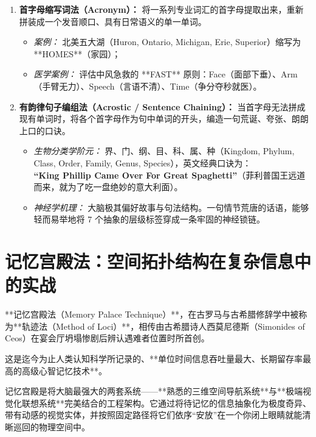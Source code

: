 \documentclass[12pt,a4paper,openany]{ctexbook}
\begin{document}
\begin{enumerate}
    \item \textbf{首字母缩写词法（Acronym）：}
    将一系列专业词汇的首字母提取出来，重新拼装成一个发音顺口、具有日常语义的单一单词。
    \begin{itemize}
        \item \emph{案例：} 北美五大湖（Huron, Ontario, Michigan, Erie, Superior）缩写为 **HOMES**（家园）；
        \item \emph{医学案例：} 评估中风急救的 **FAST** 原则：Face（面部下垂）、Arm（手臂无力）、Speech（言语不清）、Time（争分夺秒就医）。
    \end{itemize}

    \item \textbf{有韵律句子编组法（Acrostic / Sentence Chaining）：}
    当首字母无法拼成现有单词时，将各个首字母作为句中单词的开头，编造一句荒诞、夸张、朗朗上口的口诀。
    \begin{itemize}
        \item \emph{生物分类学阶元：} 界、门、纲、目、科、属、种（Kingdom, Phylum, Class, Order, Family, Genus, Species），英文经典口诀为：\\
        \textbf{“King Phillip Came Over For Great Spaghetti”}（菲利普国王远道而来，就为了吃一盘绝妙的意大利面）。
        \item \emph{神经学机理：} 大脑极其偏好故事与句法结构。一句情节荒唐的话语，能够轻而易举地将 7 个抽象的层级标签穿成一条牢固的神经锁链。
    \end{itemize}
\end{enumerate}

\section{记忆宫殿法：空间拓扑结构在复杂信息中的实战}

**记忆宫殿法（Memory Palace Technique）**，在古罗马与古希腊修辞学中被称为**轨迹法（Method of Loci）**，相传由古希腊诗人西莫尼德斯（Simonides of Ceos）在宴会厅坍塌惨剧后辨认遇难者位置时所首创。

这是迄今为止人类认知科学所记录的、**单位时间信息吞吐量最大、长期留存率最高的高级心智记忆技术**。

\begin{keypoint}[记忆宫殿的运行机制]
记忆宫殿是将大脑最强大的两套系统——**熟悉的三维空间导航系统**与**极端视觉化联想系统**完美结合的工程架构。它通过将待记忆的信息抽象化为极度奇异、带有动感的视觉实体，并按照固定路径将它们依序“安放”在一个你闭上眼睛就能清晰巡回的物理空间中。
\end{keypoint}
\end{document}
